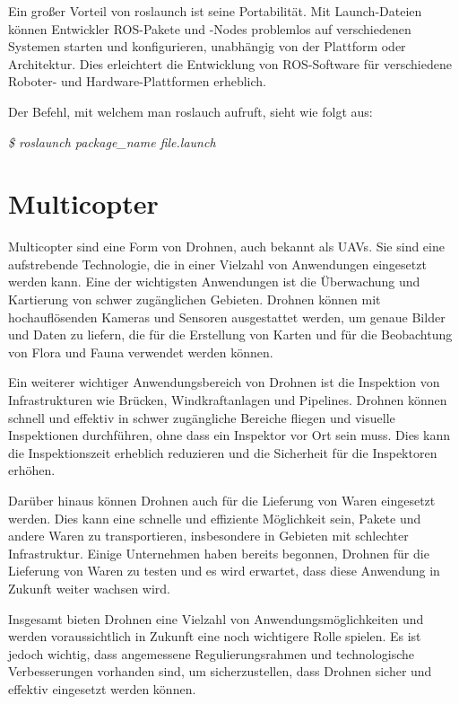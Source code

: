     Ein großer Vorteil von roslaunch ist seine Portabilität. Mit Launch-Dateien können Entwickler ROS-Pakete und -Nodes problemlos auf verschiedenen Systemen starten und konfigurieren, unabhängig von der Plattform oder Architektur. Dies erleichtert die Entwicklung von ROS-Software für verschiedene Roboter- und Hardware-Plattformen erheblich. \cite{roslaunch}

    Der Befehl, mit welchem man roslauch aufruft, sieht wie folgt aus:
    
    \textit{\$ roslaunch package\_name file.launch}

\section{Multicopter} \label{drohne:section}

Multicopter sind eine Form von Drohnen, auch bekannt als \ac{UAV}s. Sie sind eine aufstrebende Technologie, die in einer Vielzahl von Anwendungen eingesetzt werden kann. Eine der wichtigsten Anwendungen ist die Überwachung und Kartierung von schwer zugänglichen Gebieten. Drohnen können mit hochauflösenden Kameras und Sensoren ausgestattet werden, um genaue Bilder und Daten zu liefern, die für die Erstellung von Karten und für die Beobachtung von Flora und Fauna verwendet werden können.

Ein weiterer wichtiger Anwendungsbereich von Drohnen ist die Inspektion von Infrastrukturen wie Brücken, Windkraftanlagen und Pipelines. Drohnen können schnell und effektiv in schwer zugängliche Bereiche fliegen und visuelle Inspektionen durchführen, ohne dass ein Inspektor vor Ort sein muss. Dies kann die Inspektionszeit erheblich reduzieren und die Sicherheit für die Inspektoren erhöhen.

Darüber hinaus können Drohnen auch für die Lieferung von Waren eingesetzt werden. Dies kann eine schnelle und effiziente Möglichkeit sein, Pakete und andere Waren zu transportieren, insbesondere in Gebieten mit schlechter Infrastruktur. Einige Unternehmen haben bereits begonnen, Drohnen für die Lieferung von Waren zu testen und es wird erwartet, dass diese Anwendung in Zukunft weiter wachsen wird.

Insgesamt bieten Drohnen eine Vielzahl von Anwendungsmöglichkeiten und werden voraussichtlich in Zukunft eine noch wichtigere Rolle spielen. Es ist jedoch wichtig, dass angemessene Regulierungsrahmen und technologische Verbesserungen vorhanden sind, um sicherzustellen, dass Drohnen sicher und effektiv eingesetzt werden können.

